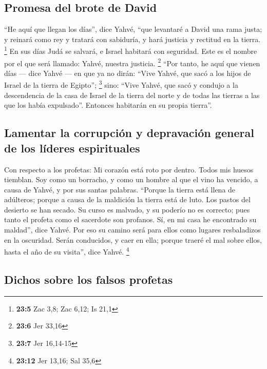 \begin{paracol}{2}
\hypertarget{promesa-del-brote-de-david}{%
\subsection{Promesa del brote de
David}\label{promesa-del-brote-de-david}}

 ``He aquí que llegan los días'', dice Yahvé, ``que
levantaré a David una rama justa; y reinará como rey y tratará con
sabiduría, y hará justicia y rectitud en la tierra. \footnote{\textbf{23:5}
  Zac 3,8; Zac 6,12; Is 21,1}  En sus días Judá se
salvará, e Israel habitará con seguridad. Este es el nombre por el que
será llamado: Yahvé, nuestra justicia. \footnote{\textbf{23:6} Jer 33,16}
 ``Por tanto, he aquí que vienen días --- dice Yahvé ---
en que ya no dirán: ``Vive Yahvé, que sacó a los hijos de Israel de la
tierra de Egipto''; \footnote{\textbf{23:7} Jer 16,14-15} 
sino: ``Vive Yahvé, que sacó y condujo a la descendencia de la casa de
Israel de la tierra del norte y de todas las tierras a las que los había
expulsado''. Entonces habitarán en su propia tierra''.

\hypertarget{lamentar-la-corrupciuxf3n-y-depravaciuxf3n-general-de-los-luxedderes-espirituales}{%
\subsection{Lamentar la corrupción y depravación general de los líderes
espirituales}\label{lamentar-la-corrupciuxf3n-y-depravaciuxf3n-general-de-los-luxedderes-espirituales}}

 Con respecto a los profetas: Mi corazón está roto por
dentro. Todos mis huesos tiemblan. Soy como un borracho, y como un
hombre al que el vino ha vencido, a causa de Yahvé, y por sus santas
palabras.  ``Porque la tierra está llena de adúlteros;
porque a causa de la maldición la tierra está de luto. Los pastos del
desierto se han secado. Su curso es malvado, y su poderío no es
correcto;  pues tanto el profeta como el sacerdote son
profanos. Sí, en mi casa he encontrado su maldad'', dice Yahvé.
 Por eso su camino será para ellos como lugares
resbaladizos en la oscuridad. Serán conducidos, y caer en ella; porque
traeré el mal sobre ellos, hasta el año de su visita'', dice Yahvé.
\footnote{\textbf{23:12} Jer 13,16; Sal 35,6}

\hypertarget{dichos-sobre-los-falsos-profetas}{%
\subsection{Dichos sobre los falsos
profetas}\label{dichos-sobre-los-falsos-profetas}}


\end{paracol}
